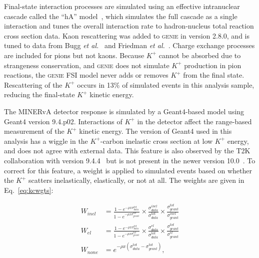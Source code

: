 \documentclass[aps,prl,preprint,showpacs,superscriptaddress,nofootinbib,floatfix,linenumbers]{revtex4}
\newcommand{\minerva}{MINERvA\xspace}
\newcommand{\genie}{\textsc{genie}\xspace}
\newcommand{\kp}{\ensuremath{K^{+}}\xspace}
\begin{document}
Final-state interaction processes are simulated using an effective intranuclear cascade called the ``hA'' model~\cite{dytmanFSI}, which simulates the full cascade as a single interaction and tunes the overall interaction rate to hadron-nucleus total reaction cross section data. Kaon rescattering was added to \genie in version 2.8.0, and is tuned to data from Bugg \textit{et al.}~\cite{bugg} and Friedman \textit{et al.}~\cite{friedman}. Charge exchange processes are included for pions but not kaons. Because \kp cannot be absorbed due to strangeness conservation, and \genie does not simulate \kp production in pion reactions, the \genie FSI model never adds or removes \kp from the final state. Rescattering of the \kp occurs in 13\% of simulated events in this analysis sample, reducing the final-state \kp kinetic energy. 

The \minerva detector response is simulated by a Geant4-based model using Geant4 version 9.4.p02. Interactions of \kp in the detector affect the range-based measurement of the \kp kinetic energy. The version of Geant4 used in this analysis has a wiggle in the \kp-carbon inelastic cross section at low \kp energy, and does not agree with external data. This feature is also observed by the T2K collaboration with version 9.4.4~\cite{martti} but is not present in the newer version 10.0~\cite{hans}. To correct for this feature, a weight is applied to simulated events based on whether the \kp scatters inelastically, elastically, or not at all. The weights are given in Eq.~\ref{eq:kcwgts}:

\begin{equation}
 \label{eq:kcwgts}
  \begin{split}
    W_{inel} & = \frac{1-e^{-\rho x \sigma_{data}^{tot}}}{1-e^{-\rho x\sigma_{geant}^{tot}}} \times \frac{\sigma_{data}^{inel}}{\sigma_{data}^{tot}} \times \frac{\sigma_{geant}^{tot}}{\sigma_{geant}^{inel}} \\
    W_{el} & = \frac{1-e^{-\rho x \sigma_{data}^{tot}}}{1-e^{-\rho x\sigma_{geant}^{tot}}} \times \frac{\sigma_{data}^{el}}{\sigma_{data}^{tot}} \times \frac{\sigma_{geant}^{tot}}{\sigma_{geant}^{el}} \\
    W_{none} & = e^{-\rho x(\sigma_{data}^{tot}-\sigma_{geant}^{tot})},
  \end{split}
\end{equation}
\end{document}
